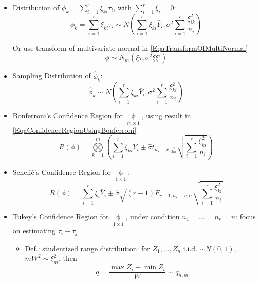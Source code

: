\begin{itemize}[topsep=2pt,itemsep=0pt]
    \item Distribution of $ \phi_k=\sum\limits_{i=1}^r\xi _{ki}\tau_i $, with $ \sum\limits_{i=1}^r\xi _i=0 $:
    \begin{equation}
        \phi_k=\sum_{i=1}^r\xi _{ki}\tau_i\sim N(\sum_{i=1}^r\xi _{ki}\bar{Y}_i,\sigma ^2\sum_{i=1}^r\dfrac{\xi _{ik}^2}{n_i})
    \end{equation}
    
    Or use transform of multivariate normal in \autoref{EqaTransformOfMultiNormal}
    \begin{equation}
         \phi \sim N_m(\xi \tau,\sigma ^2\xi \xi ')
    \end{equation}
    
    \item Sampling Distribution of $ \hat{\phi}_k  $:
    \begin{equation}
        \hat{\phi}_k\sim N(\sum_{i=1}^r\xi _{ki}\bar{Y}_i,\sigma ^2\sum_{i=1}^r\dfrac{\xi _{ki}^2}{n_i}) 
    \end{equation}
    
    \item Bonferroni's Confidence Region for $ \mathop{\phi}\limits_{m\times 1}  $, using result in \autoref{EqaConfidenceRegionUsingBonferroni}
    \begin{equation}
        R(\phi )= \bigotimes\limits_{k=1}^m\left(\sum_{i=1}^r\xi _{ki}\bar{Y}_i \pm \hat{\sigma }t_{n_T-r,\frac{\alpha }{2m}} \sqrt{\sum_{i=1}^r\dfrac{\xi _{ki}^2}{n_i}} \right)
    \end{equation}
    
    \item Scheff\`{e}'s Confidence Region for $ \mathop{\phi }\limits_{1\times 1} $:
    \begin{equation}
         R(\phi)=\sum_{i=1}^r\xi_i\bar{Y}_i\pm \hat{\sigma }\sqrt{(r-1)F_{r-1,n_T-r,\alpha }}\sqrt{\sum_{i=1}^r\dfrac{\xi _{ki}^2}{n_i}}
    \end{equation}
    
    \item Tukey's Confidence Region for $ \mathop{\phi }\limits_{1\times 1} $, under condition $ n_1=\ldots=n_r=n $: focus on estimating $ \tau_i-\tau_j $
    
    \begin{itemize}[topsep=2pt,itemsep=0pt]
        \item Def.: studentized range distribution: for $ Z_1,\ldots,Z_n $ i.i.d. $ \sim N(0 ,1) $, $ mW^2\sim \xi _m^2 $, then 
        \begin{equation}
            q=\dfrac{\max Z_i-\min Z_i}{W}\sim q_{n,m} 
        \end{equation}
    \end{itemize}
    

\end{itemize}
